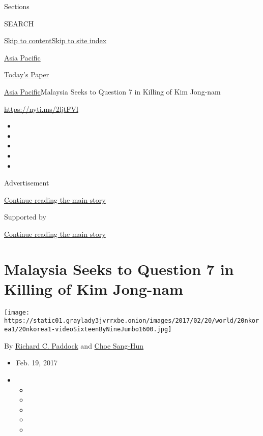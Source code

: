 Sections

SEARCH

\protect\hyperlink{site-content}{Skip to
content}\protect\hyperlink{site-index}{Skip to site index}

\href{https://www.nytimes3xbfgragh.onion/section/world/asia}{Asia
Pacific}

\href{https://myaccount.nytimes3xbfgragh.onion/auth/login?response_type=cookie\&client_id=vi}{}

\href{https://www.nytimes3xbfgragh.onion/section/todayspaper}{Today's
Paper}

\href{/section/world/asia}{Asia Pacific}\textbar{}Malaysia Seeks to
Question 7 in Killing of Kim Jong-nam

\url{https://nyti.ms/2ljtFVl}

\begin{itemize}
\item
\item
\item
\item
\item
\end{itemize}

Advertisement

\protect\hyperlink{after-top}{Continue reading the main story}

Supported by

\protect\hyperlink{after-sponsor}{Continue reading the main story}

\hypertarget{malaysia-seeks-to-question-7-in-killing-of-kim-jong-nam}{%
\section{Malaysia Seeks to Question 7 in Killing of Kim
Jong-nam}\label{malaysia-seeks-to-question-7-in-killing-of-kim-jong-nam}}

\texttt{[image: https://static01.graylady3jvrrxbe.onion/images/2017/02/20/world/20nkorea1/20nkorea1-videoSixteenByNineJumbo1600.jpg]}

By
\href{https://www.nytimes3xbfgragh.onion/by/richard-c-paddock}{Richard
C. Paddock} and
\href{http://www.nytimes3xbfgragh.onion/by/choe-sang-hun}{Choe Sang-Hun}

\begin{itemize}
\item
  Feb. 19, 2017
\item
  \begin{itemize}
  \item
  \item
  \item
  \item
  \item
  \end{itemize}
\end{itemize}

